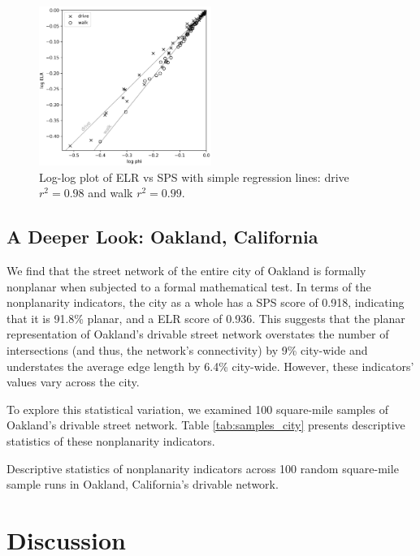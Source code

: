 \documentclass[Afour,sageh,times]{sagej}
\begin{document}
\begin{figure}[htbp]
    \center
    \includegraphics[width=0.5\textwidth]{regression_phi_split.png}
    \caption{Log-log plot of ELR vs SPS with simple regression lines: drive $r^2=0.98$ and walk $r^2=0.99$.}
    \label{fig:regression_split}
\end{figure}


\subsection{A Deeper Look: Oakland, California}

We find that the street network of the entire city of Oakland is formally nonplanar when subjected to a formal mathematical test. In terms of the nonplanarity indicators, the city as a whole has a SPS score of 0.918, indicating that it is 91.8\% planar, and a ELR score of 0.936. This suggests that the planar representation of Oakland's drivable street network overstates the number of intersections (and thus, the network's connectivity) by 9\% city-wide and understates the average edge length by 6.4\% city-wide. However, these indicators' values vary across the city.

To explore this statistical variation, we examined 100 square-mile samples of Oakland's drivable street network. Table \ref{tab:samples_city} presents descriptive statistics of these nonplanarity indicators. 



\begin{table}[htbp]
\centering
\caption{Descriptive statistics of nonplanarity indicators across 100 random square-mile sample runs in Oakland, California's drivable network.}
\label{tab:samples_city}

\end{table}






\section{Discussion}
\end{document}
